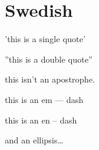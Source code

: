 
\def\mytitle{MultiMarkdown Swedish Test}


\part{Swedish}
\label{swedish}

'this is a single quote'

''this is a double quote''

this isn't an apostrophe.

this is an em --- dash

this is an en -- dash

and an ellipsis{\ldots}





